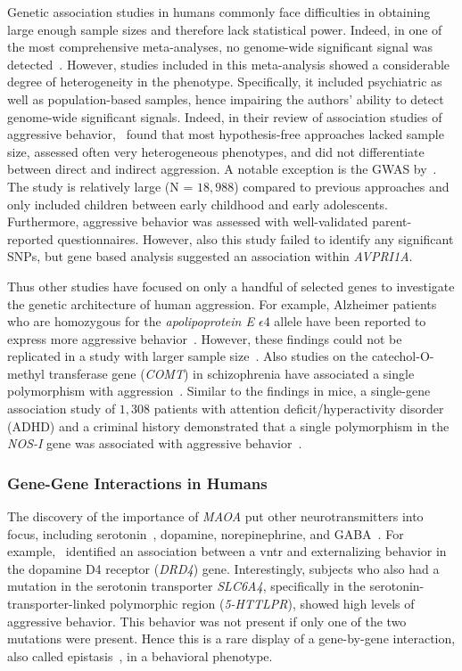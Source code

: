 Genetic association studies in humans commonly face difficulties in obtaining large enough sample sizes and therefore lack statistical power.
Indeed, in one of the most comprehensive meta-analyses, no genome-wide significant signal was detected~\citet{Vassos2014}.
However, studies included in this meta-analysis showed a considerable degree of heterogeneity in the phenotype.
Specifically, it included psychiatric as well as population-based samples, hence impairing the authors' ability to detect genome-wide significant signals.
Indeed, in their review of association studies of aggressive behavior,~\citet{Fernandez-Castillo2016} found that most hypothesis-free approaches lacked sample size, assessed often very heterogeneous phenotypes, and did not differentiate between direct and indirect aggression. 
A notable exception is the GWAS by~\citet{Pappa2016a}.
The study is relatively large (N = $18,988$) compared to previous approaches and only included children between early childhood and early adolescents.
Furthermore, aggressive behavior was assessed with well-validated parent-reported questionnaires. 
However, also this study failed to identify any significant SNPs, but gene based analysis suggested an association within \textit{AVPRI1A}.

Thus other studies have focused on only a handful of selected genes to investigate the genetic architecture of human aggression.
For example, Alzheimer patients who are homozygous for the \textit{apolipoprotein E $\epsilon 4$} allele have been reported to express more aggressive behavior~\cite{Craig2004,VanDerFlier2006}.
However, these findings could not be replicated in a study with larger sample size~\cite{Hollingworth2006}.
Also studies on the catechol-O-methyl transferase gene (\textit{COMT}) in schizophrenia have associated a single polymorphism with aggression~\cite{Hirata2013,Calati2011}.
Similar to the findings in mice, a single-gene association study of $1,308$ patients with attention deficit/hyperactivity disorder (ADHD) and a criminal history demonstrated that a single polymorphism in the \textit{NOS-I} gene was associated with aggressive behavior~\cite{Reif2009}.

\subsubsection{Gene-Gene Interactions in Humans}
\label{ssub:Gene-Gene_interactions_in_humans}

The discovery of the importance of \textit{MAOA} put other neurotransmitters into focus, including serotonin~\cite{Murphy2008}, dopamine, norepinephrine, and GABA~\cite{Marino2005,Miczek2002}.
For example,~\citet{Hohmann2009} identified an association between a \acrfull{vntr} and externalizing behavior in the dopamine D4 receptor (\textit{DRD4}) gene.
Interestingly, subjects who also had a mutation in the serotonin transporter \textit{SLC6A4}, specifically in the serotonin-transporter-linked polymorphic region (\textit{5-HTTLPR}), showed high levels of aggressive behavior.
This behavior was not present if only one of the two mutations were present.
Hence this is a rare display of a gene-by-gene interaction, also called epistasis~\cite{Anholt2012}, in a behavioral phenotype.

